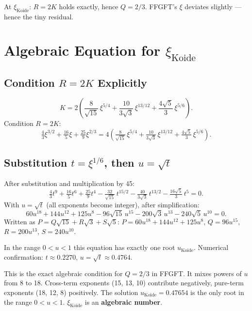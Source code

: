 At $\xi_{\text{Koide}}$: $R=2K$ holds exactly, hence $Q=2/3$.
FFGFT's $\xi$ deviates slightly --- hence the tiny residual.

\section{Algebraic Equation for $\xi_{\text{Koide}}$}


\subsection{Condition $R=2K$ Explicitly}

\[
  K = 2\!\left(
    \frac{8}{\sqrt{15}}\,\xi^{5/4}
   +\frac{10}{3\sqrt{3}}\,\xi^{13/12}
   +\frac{4\sqrt{5}}{3}\,\xi^{5/6}
  \right).
\]
Condition $R=2K$:
\[
  \tfrac{4}{3}\xi^{3/2}+\tfrac{16}{5}\xi+\tfrac{25}{9}\xi^{2/3}
  = 4\!\left(
    \tfrac{8}{\sqrt{15}}\,\xi^{5/4}
   +\tfrac{10}{3\sqrt{3}}\,\xi^{13/12}
   +\tfrac{4\sqrt{5}}{3}\,\xi^{5/6}
  \right).
\]

\subsection{Substitution $t=\xi^{1/6}$, then $u=\sqrt{t}$}

After substitution and multiplication by 45:
\[
  \tfrac{4}{3}t^9+\tfrac{16}{5}t^6+\tfrac{25}{9}t^4
  -\tfrac{32}{\sqrt{15}}\,t^{15/2}
  -\tfrac{40}{3\sqrt{3}}\,t^{13/2}
  -\tfrac{16\sqrt{5}}{3}\,t^5 = 0.
\]
With $u=\sqrt{t}$ (all exponents become integer), after simplification:
\[
  60u^{18}+144u^{12}+125u^8
  -96\sqrt{15}\,u^{15}
  -200\sqrt{3}\,u^{13}
  -240\sqrt{5}\,u^{10} = 0.
\]
Written as $P=Q\sqrt{15}+R\sqrt{3}+S\sqrt{5}$:
$P=60u^{18}+144u^{12}+125u^8$,
$Q=96u^{15}$, $R=200u^{13}$, $S=240u^{10}$.

In the range $0<u<1$ this equation has exactly one root $u_{\text{Koide}}$.
Numerical confirmation: $t\approx0.2270$, $u=\sqrt{t}\approx0.4764$.

This is the exact algebraic condition for $Q=2/3$ in FFGFT.
It mixes powers of $u$ from 8 to 18. Cross-term exponents (15, 13, 10) contribute
negatively, pure-term exponents (18, 12, 8) positively.
The solution $u_{\text{Koide}}=0.47654$ is the only root in the range $0<u<1$.
$\xi_{\text{Koide}}$ is an \textbf{algebraic number}.

